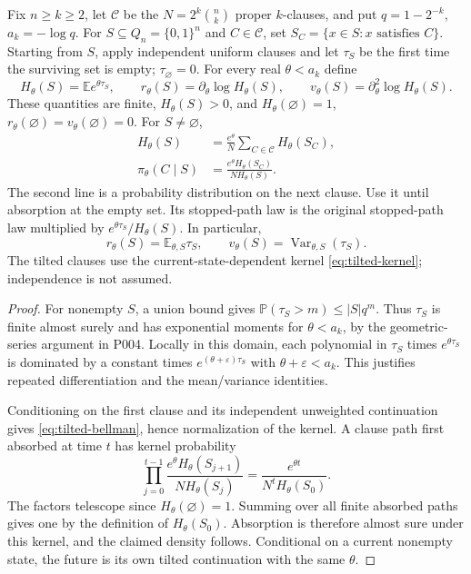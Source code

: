 \begin{proposition}
\label{prop:tilted-continuation}
Fix $n\ge k\ge2$, let $\mathcal C$ be the $N=2^k\binom nk$ proper
$k$-clauses, and put $q=1-2^{-k}$, $a_k=-\log q$.
For $S\subseteq Q_n=\{0,1\}^n$ and $C\in\mathcal C$, set
$S_C=\{x\in S:x\text{ satisfies }C\}$.
Starting from $S$, apply independent uniform clauses and let $\tau_S$ be
the first time the surviving set is empty; $\tau_\varnothing=0$.
For every real $\theta<a_k$ define
\[
 H_\theta(S)=\mathbb E e^{\theta\tau_S},\qquad
 r_\theta(S)=\partial_\theta\log H_\theta(S),\qquad
 v_\theta(S)=\partial_\theta^2\log H_\theta(S).
\]
These quantities are finite, $H_\theta(S)>0$, and
$H_\theta(\varnothing)=1$, $r_\theta(\varnothing)=v_\theta(\varnothing)=0$.
For $S\ne\varnothing$,
\begin{align}
 H_\theta(S)&=\frac{e^\theta}{N}\sum_{C\in\mathcal C}H_\theta(S_C),
 \label{eq:tilted-bellman}\\
 \pi_\theta(C\mid S)&=\frac{e^\theta H_\theta(S_C)}{N H_\theta(S)}.
 \label{eq:tilted-kernel}
\end{align}
The second line is a probability distribution on the next clause.
Use it until absorption at the empty set. Its stopped-path law is the
original stopped-path law multiplied by $e^{\theta\tau_S}/H_\theta(S)$.
In particular,
\[
 r_\theta(S)=\mathbb E_{\theta,S}\tau_S,\qquad
 v_\theta(S)=\operatorname{Var}_{\theta,S}(\tau_S).
\]
The tilted clauses use the current-state-dependent kernel
\eqref{eq:tilted-kernel}; independence is not assumed.
\end{proposition}
\begin{proof}
For nonempty $S$, a union bound gives
$\mathbb P(\tau_S>m)\le |S|q^m$.
Thus $\tau_S$ is finite almost surely and has exponential moments for
$\theta<a_k$, by the geometric-series argument in P004.
Locally in this domain, each polynomial in $\tau_S$ times
$e^{\theta\tau_S}$ is dominated by a constant times
$e^{(\theta+\varepsilon)\tau_S}$ with $\theta+\varepsilon<a_k$.
This justifies repeated differentiation and the mean/variance identities.

Conditioning on the first clause and its independent unweighted continuation
gives \eqref{eq:tilted-bellman}, hence normalization of the kernel.
A clause path first absorbed at time $t$ has kernel probability
\[
 \prod_{j=0}^{t-1}\frac{e^\theta H_\theta(S_{j+1})}{N H_\theta(S_j)}
 =\frac{e^{\theta t}}{N^t H_\theta(S_0)}.
\]
The factors telescope since $H_\theta(\varnothing)=1$.
Summing over all finite absorbed paths gives one by the definition of
$H_\theta(S_0)$. Absorption is therefore almost sure under this kernel,
and the claimed density follows. Conditional on a current nonempty state,
the future is its own tilted continuation with the same $\theta$.
\end{proof}

